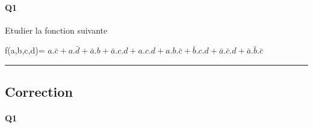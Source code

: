 \pagebreak

\paragraph{Q1}

Etudier la fonction suivante

f(a,b,c,d)= $ a.\bar c + a.\bar d + \bar a.b + \bar a.c.d  +  a.c.d + a.b.\bar c + \bar b.c.d + \bar a.\bar c.d + \bar a.\bar b.\bar c $


\hrule width 1\linewidth
\pagebreak

\subsection{Correction}


\paragraph{Q1}

